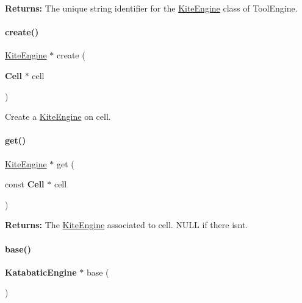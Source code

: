 {\bfseries Returns\+:} The unique string identifier for the \hyperlink{classKite_1_1KiteEngine}{Kite\+Engine} class of Tool\+Engine. \mbox{\label{classKite_1_1KiteEngine_a520d92a22c1becdc0fbbec927365db21}} 
\paragraph{\texorpdfstring{create()}{create()}}
{\footnotesize\ttfamily \hyperlink{classKite_1_1KiteEngine}{Kite\+Engine} $\ast$ create (\begin{DoxyParamCaption}\item[{\textbf{ Cell} $\ast$}]{cell }\end{DoxyParamCaption})\hspace{0.3cm}{\ttfamily [static]}}

Create a \hyperlink{classKite_1_1KiteEngine}{Kite\+Engine} on {\ttfamily cell}. \mbox{\label{classKite_1_1KiteEngine_a9905ab1f7a970bc947adb8ddf54e55e1}} 
\paragraph{\texorpdfstring{get()}{get()}}
{\footnotesize\ttfamily \hyperlink{classKite_1_1KiteEngine}{Kite\+Engine} $\ast$ get (\begin{DoxyParamCaption}\item[{const \textbf{ Cell} $\ast$}]{cell }\end{DoxyParamCaption})\hspace{0.3cm}{\ttfamily [static]}}

{\bfseries Returns\+:} The \hyperlink{classKite_1_1KiteEngine}{Kite\+Engine} associated to {\ttfamily cell}. {\ttfamily N\+U\+LL} if there isn\textquotesingle{}t. \mbox{\label{classKite_1_1KiteEngine_a2313df62af32702cf749c15d349af5ea}} 
\paragraph{\texorpdfstring{base()}{base()}}
{\footnotesize\ttfamily \textbf{ Katabatic\+Engine} $\ast$ base (\begin{DoxyParamCaption}{ }\end{DoxyParamCaption})\hspace{0.3cm}{\ttfamily [inline]}}

